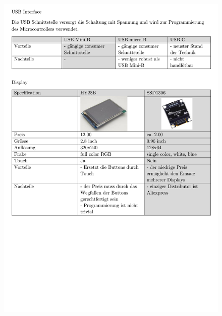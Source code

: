 \begin{appendix}
\begin{figure}[h]
	\centering
	\includegraphics[width=0.95\linewidth]{appendix/pflichtenheft(4).pdf}
\end{figure}


\end{appendix}
